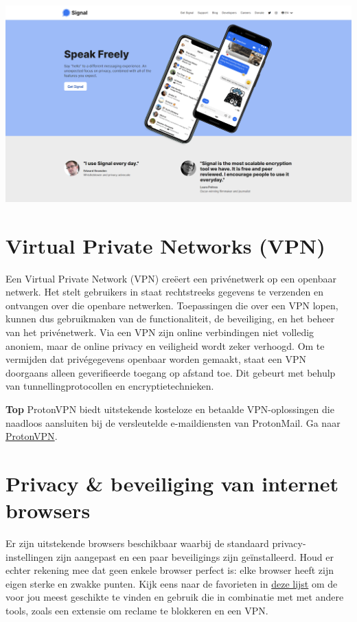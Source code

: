 \begin{borderbox}
\includegraphics[width=\textwidth]{img/ch-privacy/signal.png}
\end{borderbox}


\section{Virtual Private Networks (VPN)}
Een Virtual Private Network (VPN) cre{\"e}ert een priv{\'e}netwerk op een openbaar netwerk. Het stelt gebruikers in staat rechtstreeks gegevens te verzenden en ontvangen over die openbare netwerken. Toepassingen die over een VPN lopen, kunnen dus gebruikmaken van de functionaliteit, de beveiliging, en het beheer van het priv{\'e}netwerk. Via een VPN zijn online verbindingen niet volledig anoniem, maar de online privacy en veiligheid wordt zeker verhoogd. Om te vermijden dat priv{\'e}gegevens openbaar worden gemaakt, staat een VPN doorgaans alleen geverifieerde toegang op afstand toe. Dit gebeurt met behulp van tunnellingprotocollen en encryptietechnieken.\medskip

\begin{topbox}{\textbf{Top}}
    ProtonVPN biedt uitstekende kosteloze en betaalde VPN-oplossingen die naadloos aansluiten bij de versleutelde e-maildiensten van ProtonMail. 
    \tcblower
    Ga naar \href{https://protonvpn.com/}{ProtonVPN}.
\end{topbox}


\section{Privacy \& beveiliging van internet browsers}
Er zijn uitstekende browsers beschikbaar waarbij de standaard privacy-instellingen zijn aangepast en een paar beveiligings  zijn ge{\"i}nstalleerd. Houd er echter rekening mee dat geen enkele browser perfect is: elke browser heeft zijn eigen sterke en zwakke punten. Kijk eens naar de favorieten in \href{https://nordvpn.com/blog/best-privacy-browser/}{deze lijst} om de voor jou meest geschikte te vinden en gebruik die in combinatie met met andere tools, zoals een extensie om reclame te blokkeren en een VPN.\medskip

